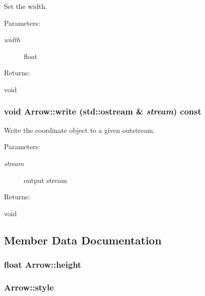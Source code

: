 Set the width. \begin{Desc}
\item[Parameters: ]\par
\begin{description}
\item[{\em 
width}]float \end{description}
\end{Desc}
\begin{Desc}
\item[Returns: ]\par
void \end{Desc}
\subsubsection{\setlength{\rightskip}{0pt plus 5cm}void Arrow::write (std::ostream \& {\em stream}) const}\label{classArrow_a12}


Write the coordinate object to a given outstream. \begin{Desc}
\item[Parameters: ]\par
\begin{description}
\item[{\em 
stream}]output stream \end{description}
\end{Desc}
\begin{Desc}
\item[Returns: ]\par
void \end{Desc}


\subsection{Member Data Documentation}
\subsubsection{\setlength{\rightskip}{0pt plus 5cm}float Arrow::height\hspace{0.3cm}{\tt  [protected]}}\label{classArrow_n4}


\subsubsection{ Arrow::style\hspace{0.3cm}{\tt  [protected]}}\label{classArrow_n1}


